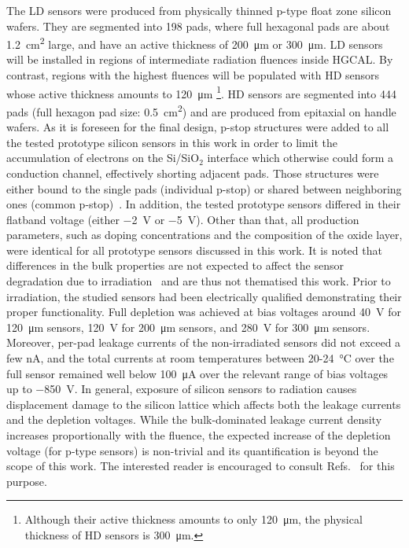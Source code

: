 The LD sensors were produced from physically thinned p-type float zone silicon wafers.
They are segmented into 198 pads, where full hexagonal pads are about \SI{1.2}{\centi\metre\squared} large, and have an active thickness of \SI{200}{\micro\meter} or \SI{300}{\micro\meter}.
LD sensors will be installed in regions of intermediate radiation fluences inside HGCAL.
By contrast, regions with the highest fluences will be populated with HD sensors whose active thickness amounts to \SI{120}{\micro\meter} \footnote{Although their active thickness amounts to only \SI{120}{\micro\meter}, the physical thickness of HD sensors is \SI{300}{\micro\meter}.}.%
HD sensors are segmented into 444 pads (full hexagon pad size: \SI{0.5}{\centi\metre\squared}) and are produced from epitaxial on handle wafers.
As it is foreseen for the final design, p-stop structures were added to all the tested prototype silicon sensors in this work in order to limit the accumulation of electrons on the Si/SiO$_2$ interface which otherwise could form a conduction channel, effectively shorting adjacent pads.
Those structures were either bound to the single pads (individual p-stop) or shared between neighboring ones (common p-stop)~\cite{Brondolin_2020}.
In addition, the tested prototype sensors differed in their flatband voltage (either \SI{-2}{\volt} or \SI{-5}{\volt}).
Other than that, all production parameters, such as doping concentrations and the composition of the oxide layer, were identical for all prototype sensors discussed in this work.
It is noted that differences in the bulk properties are not expected to affect the sensor degradation due to irradiation~\cite{MOLL199987} and are thus not thematised this work.
Prior to irradiation, the studied sensors had been electrically qualified demonstrating their proper functionality.
Full depletion was achieved at bias voltages around \SI{40}{\volt} for \SI{120}{\micro\metre} sensors, \SI{120}{\volt} for \SI{200}{\micro\metre} sensors, and \SI{280}{\volt} for \SI{300}{\micro\meter} sensors. 
Moreover, per-pad leakage currents of the non-irradiated sensors did not exceed a few nA, and the total currents at room temperatures between 20-\SI{24}{\celsius} over the full sensor remained well below \SI{100}{\micro\ampere} over the relevant range of bias voltages up to \SI{-850}{\volt}. %
In general, exposure of silicon sensors to radiation causes displacement damage to the silicon lattice which affects both the leakage currents and the depletion voltages. 
While the bulk-dominated leakage current density increases proportionally with the fluence, the expected increase of the depletion voltage (for p-type sensors) is non-trivial and its quantification is beyond the scope of this work.
The interested reader is encouraged to consult Refs.~\cite{moll:SiDamages,LINDSTROM200330} for this purpose.